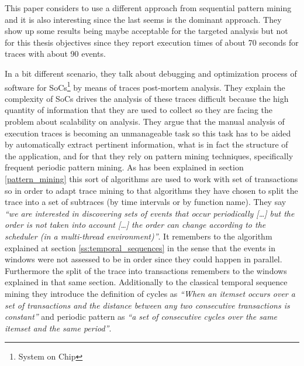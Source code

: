 This paper considers to use a different approach from sequential pattern mining
and it is also interesting since the last seems is the dominant approach. They show up
some results being maybe acceptable for the targeted analysis but not for this
thesis objectives since they report execution times of about 70 seconds for
traces with about 90 events.


In a bit different scenario, \cite{Lopez-Cueva2012} they talk about debugging 
and optimization process of
software for SoCs\footnote{System on Chip} by means of traces post-mortem
analysis. They explain the complexity of SoCs drives the analysis of these
traces difficult because the high quantity of information that they are used to
collect so they are facing the problem about scalability on analysis. They argue
that the manual analysis of execution traces is becoming an unmanageable task so
this task has to be aided by automatically extract pertinent information, what
is in fact the structure of the application, and for
that they rely on pattern mining techniques, specifically frequent periodic
pattern mining. As has been explained in section \ref{pattern_mining} this sort
of algorithms are used to work with set of transactions so in order to adapt
trace mining to that algorithms they have chosen to split the trace into a set
of subtraces (by time intervals or by function name). They say \textit{``we are
interested in discovering sets of events that occur periodically [\ldots] but
the order is not taken into account [\ldots] the order can change according to
the scheduler (in a multi-thread environment)''}. It remembers to the algorithm
explained at section \ref{ss:temporal_sequences} in the sense that the events in
windows were not assessed to be in order since they could happen in parallel.
Furthermore the split of the trace into transactions remembers to the windows
explained in that same section. Additionally to the classical temporal sequence
mining they introduce the definition of cycles as \textit{``When an itemset  occurs over 
a set of transactions and the distance between any two consecutive transactions 
is constant''} and periodic pattern as \textit{``a set of consecutive cycles over the
same itemset and the same period''}. 

